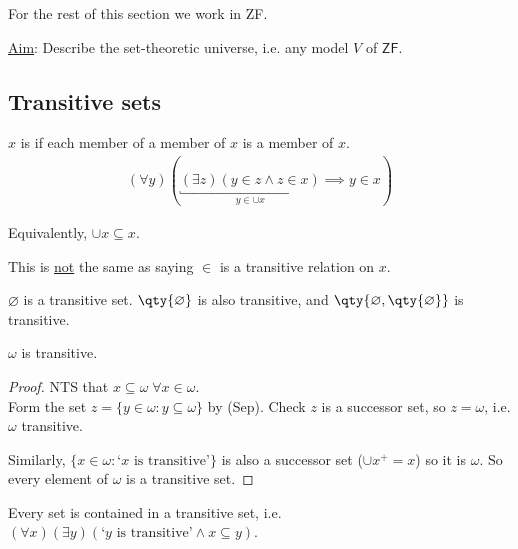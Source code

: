 For the rest of this section we work in ZF.

\underline{Aim}: Describe the set-theoretic universe, i.e. any model $V$ of $\mathsf{ZF}$.

\subsection{Transitive sets}

\begin{definition}[Transitive]
    $x$ is  if each member of a member of $x$ is a member of $x$.
    \begin{align*}
        (\forall y)(\underbracket{(\exists z)(y \in z \wedge z \in x)}_{y \in \cup x} \implies y \in x)
    \end{align*}
\end{definition}

Equivalently, $\cup x \subseteq x$.

\begin{warning}
    This is \underline{not} the same as saying $\in$ is a transitive relation on $x$.
\end{warning}

\begin{example}
    $\varnothing$ is a transitive set.
    $\qty{\varnothing}$ is also transitive, and $\qty{\varnothing, \qty{\varnothing}}$ is transitive.
\end{example}

\begin{example}
    $\omega$ is transitive.
\end{example}

\begin{proof}
    NTS that $x \subseteq \omega \; \forall x \in \omega$. \\
    Form the set $z = \{y \in \omega : y \subseteq \omega\}$ by (Sep).
    Check $z$ is a successor set, so $z = \omega$, i.e. $\omega$ transitive.

    Similarly, $\{x \in \omega : \text{`$x$ is transitive'}\}$ is also a successor set ($\cup x^+ = x$) so it is $\omega$.
    So every element of $\omega$ is a transitive set.
\end{proof}

\begin{lemma}
    Every set is contained in a transitive set, i.e. $(\forall x)(\exists y)(\text{`$y$ is transitive'} \wedge x \subseteq y)$.
\end{lemma}

